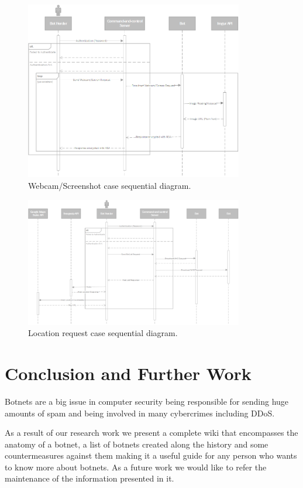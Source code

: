 \documentclass[]{article}
\begin{document}
\begin{figure}
	\centering
	\includegraphics[width=0.85\textwidth]{sequencial_webcam_diagram.png}
	\caption{Webcam/Screenshot case sequential diagram.}
	\label{fig:webcam}
\end{figure}


\begin{figure}
	\centering
	\includegraphics[width=0.85\textwidth]{location_diagram.png}
	\caption{Location request case sequential diagram.}
	\label{fig:location}
\end{figure}


\section{Conclusion and Further Work}

Botnets are a big issue in computer security being responsible for sending huge amounts of spam and being involved in many cybercrimes including DDoS. 

As a result of our research work we present a complete wiki that encompasses the anatomy of a botnet, a list of botnets created along the history and some countermeasures against them making it a useful guide for any person who wants to know more about botnets. As a future work we would like to refer the maintenance of the information presented in it.
\end{document}
